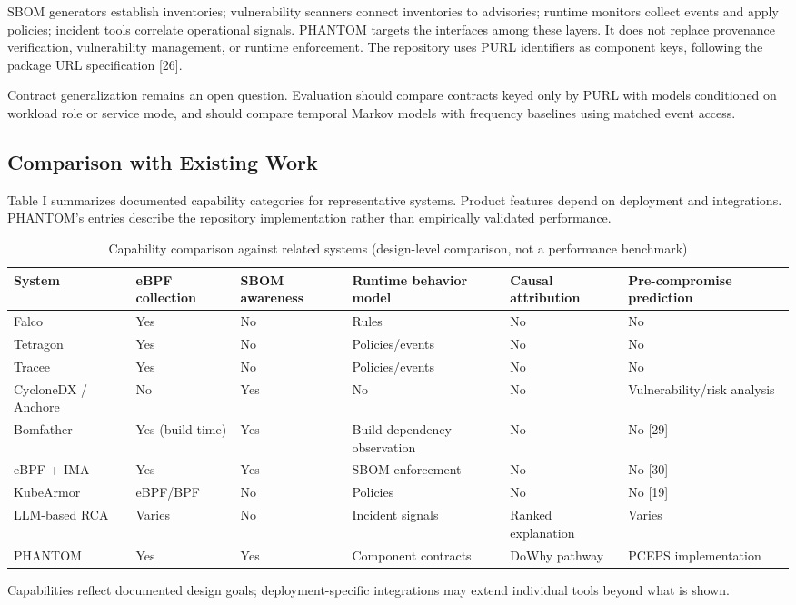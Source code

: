 \documentclass[conference]{IEEEtran}
\begin{document}
SBOM generators establish inventories; vulnerability scanners connect inventories to advisories; runtime monitors collect events and apply policies; incident tools correlate operational signals. PHANTOM targets the interfaces among these layers. It does not replace provenance verification, vulnerability management, or runtime enforcement. The repository uses PURL identifiers as component keys, following the package URL specification [26].

Contract generalization remains an open question. Evaluation should compare contracts keyed only by PURL with models conditioned on workload role or service mode, and should compare temporal Markov models with frequency baselines using matched event access.

\subsection{Comparison with Existing Work}
Table I summarizes documented capability categories for representative systems. Product features depend on deployment and integrations. PHANTOM's entries describe the repository implementation rather than empirically validated performance.
\begin{table}[t]\caption{Capability comparison against related systems (design-level comparison, not a performance benchmark)}\label{tab:positioning}\centering
\begin{tabularx}{\textwidth}{l*{5}{>{\centering\arraybackslash}X}}\toprule
System & eBPF collection & SBOM awareness & Runtime behavior model & Causal attribution & Pre-compromise prediction\\\midrule
Falco & Yes & No & Rules & No & No\\
Tetragon & Yes & No & Policies/events & No & No\\
Tracee & Yes & No & Policies/events & No & No\\
CycloneDX / Anchore & No & Yes & No & No & Vulnerability/risk analysis\\
Bomfather & Yes (build-time) & Yes & Build dependency observation & No & No [29]\\
eBPF + IMA & Yes & Yes & SBOM enforcement & No & No [30]\\
KubeArmor & eBPF/BPF & No & Policies & No & No [19]\\
LLM-based RCA & Varies & No & Incident signals & Ranked explanation & Varies\\
PHANTOM & Yes & Yes & Component contracts & DoWhy pathway & PCEPS implementation\\\bottomrule
\end{tabularx}
\par{\footnotesize Capabilities reflect documented design goals; deployment-specific integrations may extend individual tools beyond what is shown.}
\end{table}
\end{document}
